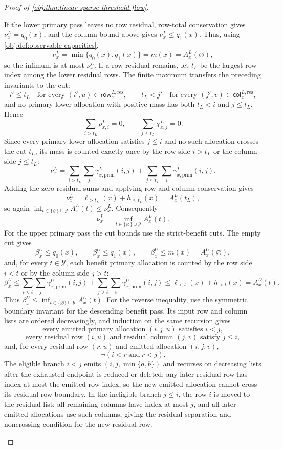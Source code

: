 \begin{proof}[Proof of \cref{obj:thm:linear-sparse-threshold-flow}]
\begin{enumerate}
If the lower primary pass leaves no row residual, row-total conservation gives \(\nu_x^L=q_0(x)\), and the column bound above gives \(\nu_x^L\le q_1(x)\).  Thus, using \cref{obj:def:observable-capacities},
\[
\nu_x^L=\min\{q_0(x),q_1(x)\}=m(x)=A_x^L(\varnothing),
\]
so the infimum is at most \(\nu_x^L\).  If a row residual remains, let \(t_L\) be the largest row index among the lower residual rows.  The finite maximum transfers the preceding invariants to the cut:
\[
i'\le t_L\quad\text{for every }(i',u)\in\mathsf{row}_{x}^{L,\mathrm{res}},
\qquad
t_L<j'\quad\text{for every }(j',v)\in\mathsf{col}_{x}^{L,\mathrm{res}},
\]
and no primary lower allocation with positive mass has both \(t_L<i\) and \(j\le t_L\).  Hence
\[
\sum_{i>t_L}\rho_{x,i}^L=0,
\qquad
\sum_{j\le t_L}\chi_{x,j}^L=0.
\]
Since every primary lower allocation satisfies \(j\le i\) and no such allocation crosses the cut \(t_L\), its mass is counted exactly once by the row side \(i>t_L\) or the column side \(j\le t_L\):
\[
\nu_x^L
=
\sum_{i>t_L}\sum_j\gamma_{x,\mathrm{prim}}^L(i,j)
+
\sum_{j\le t_L}\sum_i\gamma_{x,\mathrm{prim}}^L(i,j).
\]
Adding the zero residual sums and applying row and column conservation gives
\[
\nu_x^L
=
\ell_{>t_L}(x)+h_{\le t_L}(x)
=A_x^L(t_L),
\]
so again \(\inf_{t\in\{\varnothing\}\cup\mathcal Y}A_x^L(t)\le \nu_x^L\).  Consequently
\[
\nu_x^L
=
\inf_{t\in\{\varnothing\}\cup\mathcal Y} A_x^L(t).
\]
For the upper primary pass the cut bounds use the strict-benefit cuts.  The empty cut gives
\[
\beta_x^U\le q_0(x),
\qquad
\beta_x^U\le q_1(x),
\qquad
\beta_x^U\le m(x)=A_x^U(\varnothing),
\]
and, for every \(t\in\mathcal Y\), each benefit primary allocation is counted by the row side \(i<t\) or by the column side \(j>t\):
\[
\beta_x^U
\le
\sum_{i<t}\sum_j\gamma_{x,\mathrm{prim}}^U(i,j)
+
\sum_{j>t}\sum_i\gamma_{x,\mathrm{prim}}^U(i,j)
\le
\ell_{<t}(x)+h_{>t}(x)
=A_x^U(t).
\]
Thus \(\beta_x^U\le\inf_{t\in\{\varnothing\}\cup\mathcal Y}A_x^U(t)\).  For the reverse inequality, use the symmetric boundary invariant for the descending benefit pass.  Its input row and column lists are ordered decreasingly, and induction on the same recursion gives
\[
\text{every emitted primary allocation }(i,j,u)\text{ satisfies }i<j,
\]
\[
\text{every residual row }(i,u)\text{ and residual column }(j,v)\text{ satisfy }j\le i,
\]
and, for every residual row \((r,u)\) and emitted allocation \((i,j,v)\),
\[
\neg(i<r\ \text{and}\ r<j).
\]
The eligible branch \(i<j\) emits \((i,j,\min\{a,b\})\) and recurses on decreasing lists after the exhausted endpoint is reduced or deleted; any later residual row has index at most the emitted row index, so the new emitted allocation cannot cross its residual-row boundary.  In the ineligible branch \(j\le i\), the row \(i\) is moved to the residual list; all remaining columns have index at most \(j\), and all later emitted allocations use such columns, giving the residual separation and noncrossing condition for the new residual row.


\end{enumerate}
\end{proof}
